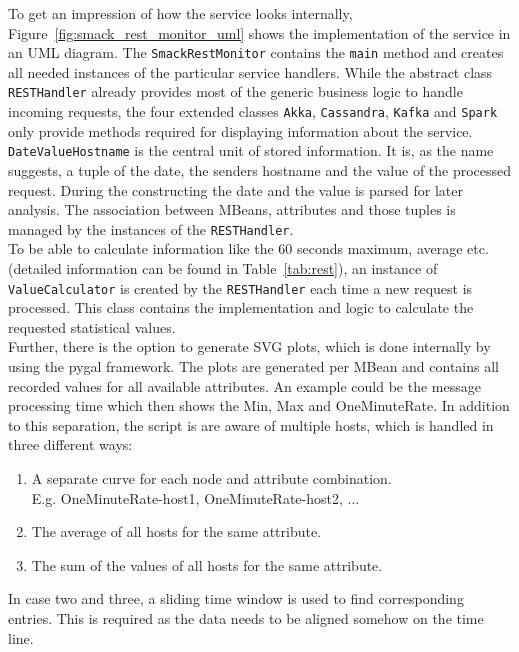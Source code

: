 To get an impression of how the service looks internally, Figure~\ref{fig:smack_rest_monitor_uml} shows the implementation of the service in an UML diagram.
The \verb|SmackRestMonitor| contains the \verb|main| method and creates all needed instances of the particular service handlers.
While the abstract class \verb|RESTHandler| already provides most of the generic business logic to handle incoming requests, the four extended classes \verb|Akka|, \verb|Cassandra|, \verb|Kafka| and \verb|Spark| only provide methods required for displaying information about the service.\\
\verb|DateValueHostname| is the central unit of stored information.
It is, as the name suggests, a tuple of the date, the senders hostname and the value of the processed request.
During the constructing the date and the value is parsed for later analysis.
The association between MBeans, attributes and those tuples is managed by the instances of the \verb|RESTHandler|.\\
To be able to calculate information like the 60 seconds maximum, average etc. (detailed information can be found in Table~\ref{tab:rest}), an instance of \verb|ValueCalculator| is created by the \verb|RESTHandler| each time a new request is processed.
This class contains the implementation and logic to calculate the requested statistical values.\\

Further, there is the option to generate SVG plots, which is done internally by using the pygal framework.
The plots are generated per MBean and contains all recorded values for all available attributes.
An example could be the message processing time which then shows the Min, Max and OneMinuteRate.
In addition to this separation, the script is are aware of multiple hosts, which is handled in three different ways:
\begin{enumerate}
      \item A separate curve for each node and attribute combination.\\
            E.g. OneMinuteRate-host1, OneMinuteRate-host2, ...
      \item The average of all hosts for the same attribute.
      \item The sum of the values of all hosts for the same attribute.
\end{enumerate}
In case two and three, a sliding time window is used to find corresponding entries.
This is required as the data needs to be aligned somehow on the time line.

